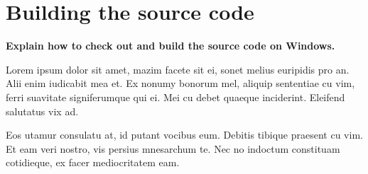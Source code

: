\documentclass[a4paper,11pt,oneside]{report}
\begin{document}
\appendix

\chapter{Building the source code}

\textbf{Explain how to check out and build the source code on Windows.}

Lorem ipsum dolor sit amet, mazim facete sit ei, sonet melius euripidis pro
an. Alii enim iudicabit mea et. Ex nonumy bonorum mel, aliquip sententiae cu
vim, ferri suavitate signiferumque qui ei. Mei cu debet quaeque
inciderint. Eleifend salutatus vix ad.

Eos utamur consulatu at, id putant vocibus eum. Debitis tibique praesent cu
vim. Et eam veri nostro, vis persius mnesarchum te. Nec no indoctum constituam
cotidieque, ex facer mediocritatem eam.
\end{document}
